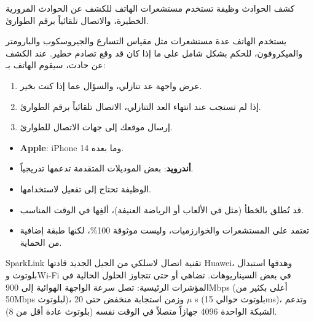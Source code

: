 
كشف الحوادث وظيفة تستخدم مستشعرات الهاتف للكشف عن الحوادث المرورية الخطيرة، والاتصال تلقائياً برقم الطوارئ.


يستخدم الهاتف عدة مستشعرات مثل مقياس التسارع والجيروسكوب والبارومتر والميكروفون، للحكم بشكل شامل على ما إذا كان قد وقع تصادم خطير. عند الكشف عن حادث، سيقوم الهاتف بـ:

\begin{enumerate}
  \item عرض واجهة عد تنازلي، والسؤال عما إذا كنت بخير.
  \item إذا لم تستجب عند انتهاء العد التنازلي، الاتصال تلقائياً برقم الطوارئ.
  \item إرسال موقعك إلى جهات الاتصال للطوارئ.
\end{enumerate}


\begin{itemize}
  \item \textbf{Apple}: iPhone 14 وما بعده.
  \item \textbf{أندرويد}: بعض الموديلات المتقدمة تدعمها تدريجياً.
\end{itemize}


\begin{itemize}
  \item الوظيفة تحتاج إلى تفعيل لاستخدامها.
  \item قد تُطلق بالخطأ (مثل في الألعاب أو الرياضة العنيفة)، ألغِها في الوقت المناسب.
  \item تعتمد على المستشعرات والخوارزميات، وليست موثوقة 100\%، لكنها طبقة إضافية من الحماية.
\end{itemize}


SparkLink تقنية اتصال لاسلكي من الجيل الجديد قادتها Huawei، وهدفها استبدال بلوتوث وWi-Fi في بعض السيناريوهات. تضاهي أو حتى تتجاوز الحلول الحالية في المؤشرات الرئيسية: تصل سرعة الواجهة الهوائية إلى 900Mbps (أعلى بكثير من 50Mbps لبلوتوث)، وزمن استجابة منخفض حتى 20 $\mu$ s (بلوتوث حوالي 15ms)، وتدعم الشبكة الواحدة 4096 جهازاً متصلاً في الوقت نفسه (بلوتوث عادة أقل من 8).


